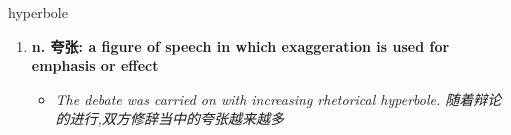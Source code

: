 
\begin{frame}
{\huge hyperbole}
\begin{center}
\begin{enumerate}\Large
  \item \textbf{n. 夸张: a figure of speech in which exaggeration is used for emphasis or effect}
  \begin{itemize}
    \item \em{\Large{The debate was carried on with increasing rhetorical hyperbole. 随着辩论的进行,双方修辞当中的夸张越来越多}}
  \end{itemize}
\end{enumerate}
\end{center}
\end{frame}
